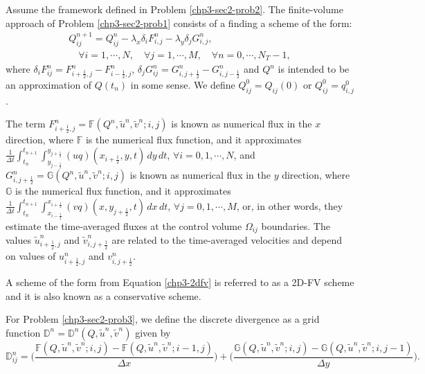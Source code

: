 \begin{prob}[2D-FV scheme]
	\label{chp3-sec2-prob3}
	Assume the framework defined in Problem \ref{chp3-sec2-prob2}.
	The finite-volume approach of Problem \ref{chp3-sec2-prob1}
	consists of a finding a scheme of the form:
	\begin{align}
		\label{chp3-2dfv}
		{Q}_{ij}^{n+1} =  {Q}_{ij}^{n} - {\lambda_x} \delta_i {F}_{i,j}^{n} - {\lambda_y } \delta_j {G}_{i,j}^{n},
		\\ \nonumber \quad \forall i = 1, \cdots, N, \quad \forall j = 1, \cdots, M,
		\quad \forall n = 0, \cdots, N_T-1,
	\end{align}
	where $ \delta_i F_{ij}^n =
    {F}_{i+\frac{1}{2},j}^{n} 
    - {F}_{i-\frac{1}{2},j}^{n}$,
    $ \delta_j G_{ij}^n =
    {G}_{i,j+\frac{1}{2}}^{n} 
    - {G}_{i,j-\frac{1}{2}}^{n}$ 
    and ${Q}^{n}$ is intended to be an approximation
	of ${Q}(t_{n})$ in some sense. We define ${Q}_{ij}^{0} = {Q}_{ij}(0)$ or
	${Q}_{ij}^{0} = {q}^0_{i,j}$.
    
    The term ${F}_{i+\frac{1}{2}, j}^{n} = {\mathbb{F}}
    (Q^n, \tilde{u}^n, \tilde{v}^n; i,j)
    $ is known as numerical flux in the 
    $x$ direction, where $\mathbb{F}$ is the numerical flux function, 
    and it approximates
	$\frac{1}{\Delta t}\int_{t_n}^{t_{n+1}} 
    \int_{y_{j-\frac{1}{2}}}^{y_{j+\frac{1}{2}}} 
    (uq)(x_{i+\frac{1}{2}}, y, t) \,dy \,dt $,
    $\forall i = 0, 1, \cdots, N$, and 
	${G}_{i, j+\frac{1}{2}}^{n} = 
    {\mathbb{G}} (Q^n, \tilde{u}^n, \tilde{v}^n; i, j)$ 
    is known as numerical flux in the 
    $y$ direction, where $\mathbb{G}$ 
    is the numerical flux function, and it approximates
	$\frac{1}{\Delta t}\int_{t_n}^{t_{n+1}}  
    \int_{x_{i-\frac{1}{2}}}^{x_{i+\frac{1}{2}}}
    (vq)(x, y_{j+\frac{1}{2}}, t) \,dx \,dt $,
    $\forall j = 0, 1, \cdots, M$,
	or, in other words, they estimate the time-averaged
    fluxes at the control volume $\Omega_{ij}$ boundaries.
  	The values $\tilde{u}_{i+\frac{1}{2},j}^n$ and $\tilde{v}_{i,j+\frac{1}{2}}^n$ are related to the time-averaged velocities
  	and depend on values of $u_{i+\frac{1}{2},j}^n$ and $v_{i,j+\frac{1}{2}}^n$.
\end{prob}
\begin{remark}
	A scheme of the form from Equation \eqref{chp3-2dfv} is referred to as a 2D-FV scheme and
	it is also known as a conservative scheme.
\end{remark}
\begin{definition}
	\label{chp3-def-div}
	For Problem \ref{chp3-sec2-prob3}, we define the discrete divergence as a grid function $\mathbb{D}^n=\mathbb{D}^n(Q,\tilde{u}^n,\tilde{v}^n)$
	given by
	\begin{equation}
		\label{chp3-def-div-eq}
		\mathbb{D}_{ij}^n=\bigg( \frac{\mathbb{F}(Q,\tilde{u}^n,\tilde{v}^n;i,j) - \mathbb{F}(Q,\tilde{u}^n,\tilde{v}^n;i-1,j)}{\Delta x} \bigg) +
				 \bigg( \frac{\mathbb{G}(Q,\tilde{u}^n,\tilde{v}^n;i,j) - \mathbb{G}(Q,\tilde{u}^n,\tilde{v}^n;i,j-1)}{\Delta y} \bigg).
	\end{equation}
\end{definition}

